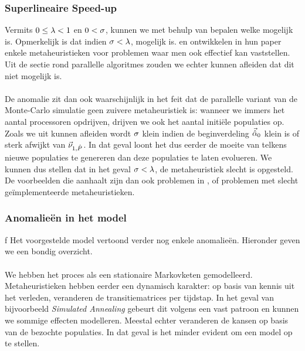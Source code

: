 \subsubsection{Superlineaire Speed-up}

Vermits $0\leq\metapb<1$ en $0<\metapa$, kunnen we met behulp van  bepalen welke \absu{} mogelijk is. Opmerkelijk is dat indien $\metapa<\metapb$, \abslsu{} mogelijk is.  en  ontwikkelen in hun paper\cite{DBLP:journals/jc/ShonkwilerV94} enkele metaheuristieken voor problemen waar men ook effectief \abslsu{} kan vaststellen. Uit de sectie rond parallelle algoritmes zouden we echter kunnen afleiden dat dit niet mogelijk is.

\paragraph{}
De anomalie zit dan ook waarschijnlijk in het feit dat de parallelle variant van de Monte-Carlo simulatie geen zuivere metaheuristiek is: wanneer we immers het aantal processoren opdrijven, drijven we ook het aantal initi\"ele populaties op. Zoals we uit  kunnen afleiden wordt $\metapa$ klein indien de beginverdeling $\probdistnormmeta{0}$ klein is of sterk afwijkt van $\evr[1,\removmat]$. In dat geval loont het dus eerder de moeite van telkens nieuwe populaties te genereren dan deze populaties te laten evolueren. We kunnen dus stellen dat in het geval $\metapa<\metapb$, de metaheuristiek slecht is opgesteld. De voorbeelden die \cite{DBLP:journals/jc/ShonkwilerV94} aanhaalt zijn dan ook problemen in , of problemen met slecht ge\"implementeerde metaheuristieken.

\subsubsection{Anomalie\"en in het model}
f
Het voorgestelde model vertoond verder nog enkele anomalie\"en. Hieronder geven we een bondig overzicht.

\paragraph{}
We hebben het proces als een stationaire Markovketen gemodelleerd. Metaheuristieken hebben eerder een dynamisch karakter: op basis van kennis uit het verleden, veranderen de transitiematrices per tijdstap. In het geval van bijvoorbeeld \emph{Simulated Annealing} gebeurt dit volgens een vast patroon en kunnen we sommige effecten modelleren\cite{}. Meestal echter veranderen de kansen op basis van de bezochte populaties. In dat geval is het minder evident om een model op te stellen.

